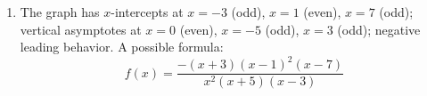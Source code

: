 \documentclass{ximera}
\begin{document}
\begin{problem}
\begin{solution}
\begin{enumerate}
  \item[(b)] The graph has $x$-intercepts at $x=-3$ (odd), $x=1$ (even), $x=7$ (odd); vertical asymptotes at $x=0$ (even), $x=-5$ (odd), $x=3$ (odd); negative leading behavior. A possible formula:
  $$f(x) = \frac{-(x+3)(x-1)^2(x-7)}{x^2(x+5)(x-3)}$$
\end{enumerate}
\end{solution}
\end{problem}
\end{document}
